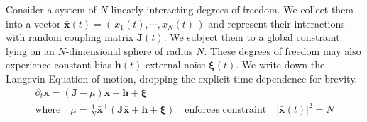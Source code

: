 
Consider a system of $N$ linearly interacting degrees of freedom. We collect them into a vector $\mathbf{\bar x}(t) = \left(\,x_1(t),\cdots, x_N(t)\,\right)$ and represent their interactions with random coupling matrix $\mathbf{J}(t)$. We subject them to a global constraint: lying on an $N$-dimensional sphere of radius $N$. These degrees of freedom may also experience constant bias $\mathbf{h}(t)$ external noise $\boldsymbol\xi(t)$. We write down the Langevin Equation of motion, dropping the explicit time dependence for brevity.
\begin{gather}
\partial_t\mathbf{\bar x} = (\mathbf{J}-\mu)\mathbf{\bar x}+\mathbf{h}+\boldsymbol\xi\quad\\
\text{where}\quad\mu = \frac{1}{N}\mathbf{\bar x}^{\top}\left(\mathbf{J}\mathbf{\bar x}+\mathbf{h}+\boldsymbol\xi\right)\quad\text{enforces constraint}\quad|\mathbf{\bar x}(t)|^2=N
\end{gather}
